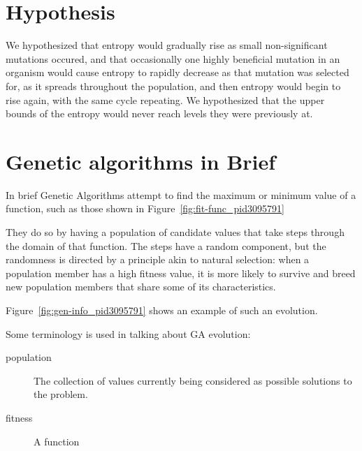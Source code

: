 \documentclass[11pt]{article}
\begin{document}
\section{Hypothesis}
\label{sec:org26a3be1}
We hypothesized that entropy would gradually rise as small non-significant
mutations occured, and that occasionally one highly beneficial mutation in
an organism would cause entropy to rapidly decrease as that mutation was
selected for, as it spreads throughout the population, and then entropy would
begin to rise again, with the same cycle repeating. We hypothesized that the
upper bounds of the entropy would never reach levels they were previously at.


\section{Genetic algorithms in Brief}

In brief Genetic Algorithms attempt to find the maximum or minimum
value of a function, such as those shown in
Figure~\ref{fig:fit-func_pid3095791}

They do so by having a population of candidate values that take steps
through the domain of that function.  The steps have a random
component, but the randomness is directed by a principle akin to
natural selection: when a population member has a high fitness value,
it is more likely to survive and breed new population members that
share some of its characteristics.

Figure~\ref{fig:gen-info_pid3095791} shows an example of such an
evolution.

Some terminology is used in talking about GA evolution:

\begin{description}
\item[population] The collection of values currently being considered
  as possible solutions to the problem.
\item[fitness] A function 
\end{description}
\end{document}
